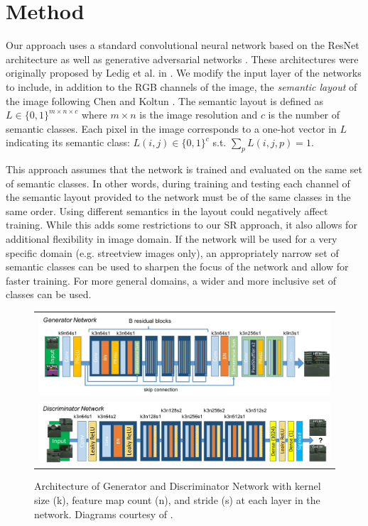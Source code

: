 \documentclass[10pt,twocolumn,letterpaper]{article}
\begin{document}
\section{Method}
\label{sec:method}

Our approach uses a standard convolutional neural network based on the ResNet
architecture \cite{ResNet} as well as generative adversarial networks
\cite{GAN}. These architectures were originally proposed by Ledig et al. in
\cite{SRGAN}. We modify the input layer of the networks to include, in addition
to the RGB channels of the image, the \textit{semantic layout} of the image
following Chen and Koltun \cite{ImageSynthesis}. The semantic layout is defined
as $L \in \{0, 1\}^{m \times n \times c}$ where $m \times n$ is the image
resolution and $c$ is the number of semantic classes. Each pixel in the image
corresponds to a one-hot vector in $L$ indicating its semantic class: $L(i, j)
\in \{0, 1\}^c$ s.t. $\sum_p L(i, j, p) = 1$.

This approach assumes that the network is trained and evaluated on the same set
of semantic classes. In other words, during training and testing each channel
of the semantic layout provided to the network must be of the same classes in
the same order. Using different semantics in the layout could negatively affect
training. While this adds some restrictions to our SR approach, it also allows
for additional flexibility in image domain. If the network will be used for a
very specific domain (e.g. streetview images only), an appropriately narrow set
of semantic classes can be used to sharpen the focus of the network and allow
for faster training. For more general domains, a wider and more inclusive set
of classes can be used.

\begin{figure}[ht!]
\begin{center}
    \begin{tabular}{c}
	\includegraphics[width=6.5in]{images/generator_architecture.png} \\
	\includegraphics[width=6.5in]{images/discriminator_architecture.png}
    \end{tabular}
\end{center}
    \caption{Architecture of Generator and Discriminator Network with kernel
    size (k), feature map count (n), and stride (s) at each layer in the
    network. Diagrams courtesy of \cite{SRGAN}.}
    \label{fig:architecture}
\end{figure}
\end{document}
